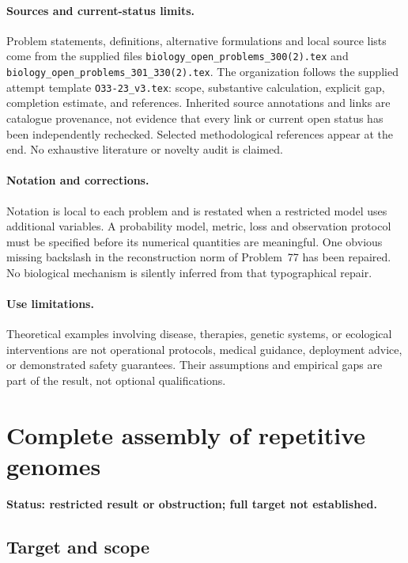 \documentclass[11pt]{article}
\begin{document}
\paragraph{Sources and current-status limits.}
Problem statements, definitions, alternative formulations and local source lists
come from the supplied files
\texttt{biology\_open\_problems\_300(2).tex} and
\texttt{biology\_open\_problems\_301\_330(2).tex}.
The organization follows the supplied attempt template
\texttt{O33-23\_v3.tex}: scope, substantive calculation, explicit gap,
completion estimate, and references. Inherited source annotations and links are
catalogue provenance, not evidence that every link or current open status has
been independently rechecked. Selected methodological references appear at the
end. No exhaustive literature or novelty audit is claimed.

\paragraph{Notation and corrections.}
Notation is local to each problem and is restated when a restricted model uses
additional variables. A probability model, metric, loss and observation protocol
must be specified before its numerical quantities are meaningful. One obvious
missing backslash in the reconstruction norm of Problem~77 has been repaired.
No biological mechanism is silently inferred from that typographical repair.

\paragraph{Use limitations.}
Theoretical examples involving disease, therapies, genetic systems, or ecological
interventions are not operational protocols, medical guidance, deployment advice,
or demonstrated safety guarantees. Their assumptions and empirical gaps are part
of the result, not optional qualifications.


\section*{Complete assembly of repetitive genomes}
\label{prob:066}
\noindent\textbf{Status: restricted result or obstruction; full target not established.}
\subsection{Target and scope}
\end{document}
